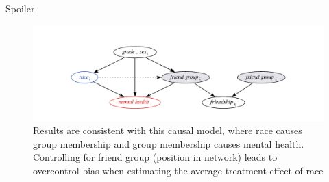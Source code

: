 \documentclass{beamer}
\theoremstyle{remark}
\begin{document}
\begin{frame}{Spoiler}

    \begin{figure}
        \centering
        \includegraphics[width=\textwidth]{figures/addhealth-dag.pdf}
        \caption{Results are consistent with this causal model, where race causes group membership and group membership causes mental health. Controlling for friend group (position in network) leads to overcontrol bias when estimating the average treatment effect of race}
        \label{fig:addhealth-dag}
    \end{figure}

\end{frame}
\end{document}
